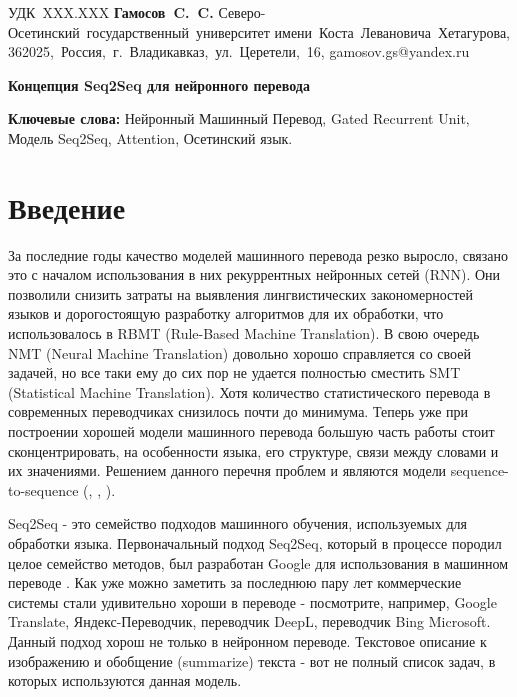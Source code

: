 \documentclass[a4paper,12pt]{article}
\begin{document}
    \pagestyle{empty}
    \vbox{%
        \hfill%
        \vbox{%
            \hbox{УДК XXX.XXX}%
            \hbox{\textbf{Гамосов C. C.}}%
            \hbox{Северо-Осетинский государственный университет}%
            \hbox{имени Коста Левановича Хетагурова,}%
            \hbox{362025, Россия, г. Владикавказ, ул. Церетели, 16,}%
            \hbox{gamosov.gs@yandex.ru}%
        }%
    }
    
    \begin{center}
        \Large{\textbf{Концепция Seq2Seq для нейронного перевода}}
    \end{center}
    
    \textbf{Ключевые слова:} Нейронный Машинный Перевод, Gated Recurrent Unit, Модель Seq2Seq, Attention, Осетинский язык.
    
    \section*{Введение}
    
	За последние годы качество моделей машинного перевода резко выросло, связано это с началом использования в них рекуррентных нейронных сетей (RNN). Они позволили снизить затраты на выявления лингвистических закономерностей языков и дорогостоящую разработку алгоритмов для их обработки, что использовалось в RBMT (Rule-Based Machine Translation). В свою очередь NMT (Neural Machine Translation) довольно хорошо справляется со своей задачей, но все таки ему до сих пор не удается полностью сместить SMT (Statistical Machine Translation). Хотя количество статистического перевода в современных переводчиках снизилось почти до минимума. Теперь уже при построении хорошей модели машинного перевода большую часть работы стоит сконцентрировать, на особенности языка, его структуре, связи между словами и их значениями. Решением данного перечня проблем и являются модели sequence-to-sequence (\cite{4}, \cite{5}, \cite{6}).
	
    Seq2Seq - это семейство подходов машинного обучения, используемых для обработки языка. Первоначальный подход Seq2Seq, который в процессе породил целое семейство методов, был разработан Google для использования в машинном переводе \cite{11}. Как уже можно заметить за последнюю пару лет коммерческие системы стали удивительно хороши в переводе - посмотрите, например, Google Translate, Яндекс-Переводчик, переводчик DeepL, переводчик Bing Microsoft. Данный подход хорош не только в нейронном переводе. Текстовое описание к изображению и обобщение (summarize) текста - вот не полный список задач, в которых используются данная модель.
	
\end{document}
